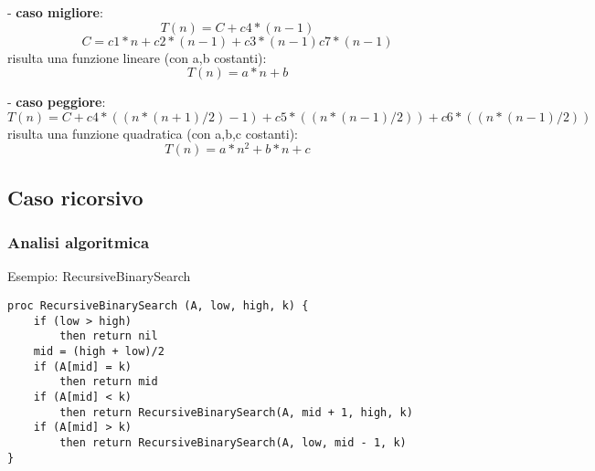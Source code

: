 - \textbf{caso migliore}:
\[T(n) = C + c4 * (n - 1)\]
\[C = c1 * n + c2 * (n-1) + c3 * (n-1) c7 * (n-1)\]
risulta una funzione lineare (con a,b costanti):
\[T(n) = a * n + b\]

- \textbf{caso peggiore}: 
\[T(n) = C + c4 * ( (n * (n + 1) / 2) - 1) + c5 * ( (n * (n - 1) / 2) ) + c6 * ( (n * (n - 1) / 2) )\]
risulta una funzione quadratica (con a,b,c costanti):
\[T(n) = a * n^2 + b * n + c\]

\subsection{Caso ricorsivo}
\subsubsection{Analisi algoritmica}
Esempio: RecursiveBinarySearch
\begin{verbatim}
proc RecursiveBinarySearch (A, low, high, k) {
    if (low > high)
        then return nil
    mid = (high + low)/2
    if (A[mid] = k)
        then return mid
    if (A[mid] < k)
        then return RecursiveBinarySearch(A, mid + 1, high, k)
    if (A[mid] > k)
        then return RecursiveBinarySearch(A, low, mid - 1, k)
}
\end{verbatim}
